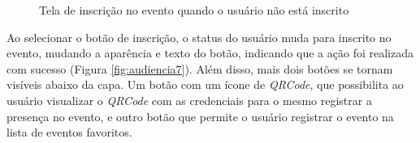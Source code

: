 \begin{figure}[H]
    \centering
    \caption{Tela de inscrição no evento quando o usuário não está inscrito}
    \label{fig:audiencia6}
\end{figure}

Ao selecionar o botão de inscrição, o status do usuário muda para inscrito no evento, mudando a aparência e texto do botão, indicando que a ação foi realizada com sucesso (Figura \ref{fig:audiencia7}). Além disso, mais dois botões se tornam visíveis abaixo da capa. Um botão com um ícone de \textit{QRCode}, que possibilita ao usuário visualizar o \textit{QRCode} com as credenciais para o mesmo registrar a presença no evento, e outro botão que permite o usuário registrar o evento na lista de eventos favoritos.

